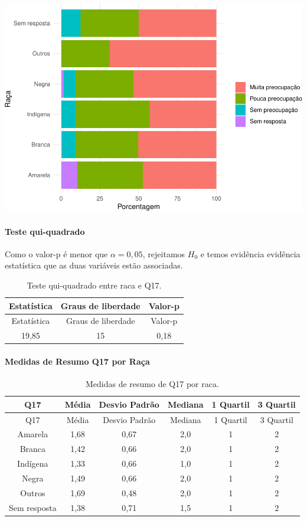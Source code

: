 \documentclass[]{article}
\let\oldparagraph\paragraph
\renewcommand{\paragraph}[1]{\oldparagraph{#1}\mbox{}}
\begin{document}
\begin{center}\includegraphics[width=0.75\linewidth]{relatorio_files/figure-latex/unnamed-chunk-203-1} \end{center}

\hypertarget{teste-qui-quadrado-21}{%
\paragraph{Teste qui-quadrado}\label{teste-qui-quadrado-21}}

Como o valor-p é menor que \(\alpha=0,05\), rejeitamos \(H_0\) e temos evidência evidência estatística que as duas variáveis estão associadas.

\begin{longtable}[]{@{}ccc@{}}
\caption{\label{tab:unnamed-chunk-204}Teste qui-quadrado entre raca e Q17.}\tabularnewline
\toprule
Estatística & Graus de liberdade & Valor-p\tabularnewline
\midrule
\endfirsthead
\toprule
Estatística & Graus de liberdade & Valor-p\tabularnewline
\midrule
\endhead
19,85 & 15 & 0,18\tabularnewline
\bottomrule
\end{longtable}

\cleardoublepage

\hypertarget{medidas-de-resumo-q17-por-rauxe7a}{%
\paragraph{Medidas de Resumo Q17 por Raça}\label{medidas-de-resumo-q17-por-rauxe7a}}

\begin{longtable}[]{@{}cccccc@{}}
\caption{\label{tab:unnamed-chunk-205}Medidas de resumo de Q17 por raca.}\tabularnewline
\toprule
Q17 & Média & Desvio Padrão & Mediana & 1 Quartil & 3 Quartil\tabularnewline
\midrule
\endfirsthead
\toprule
Q17 & Média & Desvio Padrão & Mediana & 1 Quartil & 3 Quartil\tabularnewline
\midrule
\endhead
Amarela & 1,68 & 0,67 & 2,0 & 1 & 2\tabularnewline
Branca & 1,42 & 0,66 & 2,0 & 1 & 2\tabularnewline
Indígena & 1,33 & 0,66 & 1,0 & 1 & 2\tabularnewline
Negra & 1,49 & 0,66 & 2,0 & 1 & 2\tabularnewline
Outros & 1,69 & 0,48 & 2,0 & 1 & 2\tabularnewline
Sem resposta & 1,38 & 0,71 & 1,5 & 1 & 2\tabularnewline
\bottomrule
\end{longtable}
\end{document}
